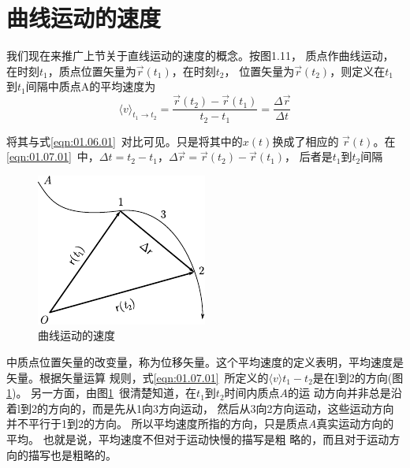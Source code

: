 \section{曲线运动的速度}\label{sec:01.07}

我们现在来推广上节关于直线运动的速度的概念。按图1.11，
质点作曲线运动，在时刻$t_1$，质点位置矢量为$\vec{r}(t_1)$，在时刻$t_2$，
位置矢量为$\vec{r}(t_2)$，则定义在$t_1$到$t_1$间隔中质点A的平均速度为
\begin{equation}\label{eqn:01.07.01}
    \langle v \rangle_{t_1\rightarrow t_2}=\frac{\vec{r}(t_2)-\vec{r}(t_1)}{t_2-t_1}=\frac{\Delta \vec{r}}{\Delta t}
\end{equation}

\noindent 将其与式\eqref{eqn:01.06.01}~对比可见。只是将其中的$x(t)$换成了相应的
$\vec{r}(t)$。在\eqref{eqn:01.07.01}~中，$\Delta t=t_2-t_1$，$\Delta \vec{r}=\vec{r}(t_2)-\vec{r}(t_1)$，
后者是$t_1$到$t_2$间隔
\begin{figure}
    \centering
    \small
    \includegraphics{figure/fig01.11}
    \caption{曲线运动的速度}
    \label{fig:01.11}
\end{figure}
中质点位置矢量的改变量，称为位移矢量。这个平均速度的定义表明，平均速度是矢量。根据矢量运算
规则，式\eqref{eqn:01.07.01}~所定义的$\langle v\rangle t_1-t_2$是在l到2的方向(图\ref{fig:01.11})。
另一方面，由图\ref{fig:01.11}~很清楚知道，在$t_1$到$t_2$时间内质点$A$的运
动方向并非总是沿着l到2的方向的，而是先从1向3方向运动，
然后从3向2方向运动，这些运动方向并不平行于1到2的方向。
所以平均速度所指的方向，只是质点$A$真实运动方向的平均。
也就是说，平均速度不但对于运动快慢的描写是粗
略的，而且对于运动方向的描写也是粗略的。

